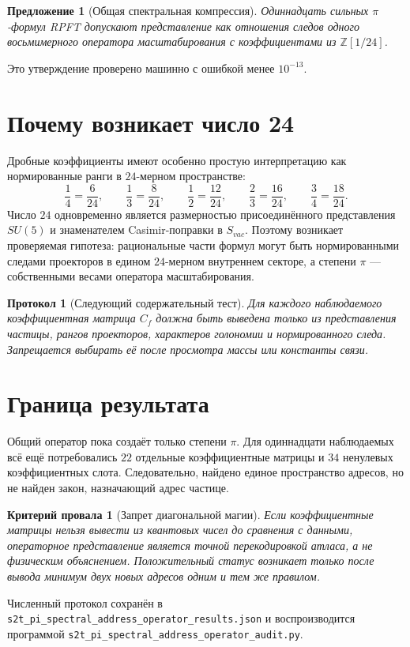 \documentclass[12pt,a4paper]{article}
\newtheorem{proposition}{Предложение}
\newtheorem{protocol}{Протокол}
\newtheorem{nogocriterion}{Критерий провала}
\begin{document}
\begin{proposition}[Общая спектральная компрессия]
Одиннадцать сильных $\pi$-формул RPFT допускают представление как отношения
следов одного восьмимерного оператора масштабирования с коэффициентами из
$\mathbb Z[1/24]$.
\end{proposition}

Это утверждение проверено машинно с ошибкой менее $10^{-13}$.

\section{Почему возникает число 24}

Дробные коэффициенты имеют особенно простую интерпретацию как нормированные
ранги в $24$-мерном пространстве:
\begin{equation}
 \frac14=\frac6{24},\qquad
 \frac13=\frac8{24},\qquad
 \frac12=\frac{12}{24},\qquad
 \frac23=\frac{16}{24},\qquad
 \frac34=\frac{18}{24}.
\end{equation}
Число $24$ одновременно является размерностью присоединённого представления
$SU(5)$ и знаменателем Casimir-поправки в $S_{vac}$. Поэтому возникает
проверяемая гипотеза: рациональные части формул могут быть нормированными
следами проекторов в едином $24$-мерном внутреннем секторе, а степени $\pi$ ---
собственными весами оператора масштабирования.

\begin{protocol}[Следующий содержательный тест]
Для каждого наблюдаемого коэффициентная матрица $C_f$ должна быть выведена
только из представления частицы, рангов проекторов, характеров голономии и
нормированного следа. Запрещается выбирать её после просмотра массы или
константы связи.
\end{protocol}

\section{Граница результата}

Общий оператор пока создаёт только степени $\pi$. Для одиннадцати наблюдаемых
всё ещё потребовались $22$ отдельные коэффициентные матрицы и $34$ ненулевых
коэффициентных слота. Следовательно, найдено единое пространство адресов, но
не найден закон, назначающий адрес частице.

\begin{nogocriterion}[Запрет диагональной магии]
Если коэффициентные матрицы нельзя вывести из квантовых чисел до сравнения с
данными, операторное представление является точной перекодировкой атласа, а не
физическим объяснением. Положительный статус возникает только после вывода
минимум двух новых адресов одним и тем же правилом.
\end{nogocriterion}

Численный протокол сохранён в
\texttt{s2t\_pi\_spectral\_address\_operator\_results.json} и воспроизводится
программой \texttt{s2t\_pi\_spectral\_address\_operator\_audit.py}.
\end{document}
